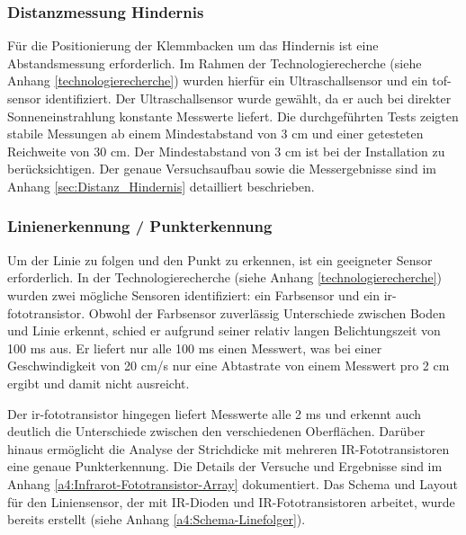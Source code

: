 \documentclass[../main.tex]{subfiles}
\begin{document}
\subsubsection{Distanzmessung Hindernis}
Für die Positionierung der Klemmbacken um das Hindernis ist eine Abstandsmessung erforderlich. Im Rahmen der Technologierecherche (siehe Anhang \ref{technologierecherche}) wurden hierfür ein Ultraschallsensor und ein \acrshort{tof-sensor} identifiziert. Der Ultraschallsensor wurde gewählt, da er auch bei direkter Sonneneinstrahlung konstante Messwerte liefert. Die durchgeführten Tests zeigten stabile Messungen ab einem Mindestabstand von 3 cm und einer getesteten Reichweite von 30 cm. Der Mindestabstand von 3 cm ist bei der Installation zu berücksichtigen. Der genaue Versuchsaufbau sowie die Messergebnisse sind im Anhang \ref{sec:Distanz_Hindernis} detailliert beschrieben.

\newpage

\subsubsection{Linienerkennung / Punkterkennung}
Um der Linie zu folgen und den Punkt zu erkennen, ist ein geeigneter Sensor erforderlich. In der Technologierecherche (siehe Anhang \ref{technologierecherche}) wurden zwei mögliche Sensoren identifiziert: ein Farbsensor und ein \gls{ir-fototransistor}. Obwohl der Farbsensor zuverlässig Unterschiede zwischen Boden und Linie erkennt, schied er aufgrund seiner relativ langen Belichtungszeit von 100 ms aus. Er liefert nur alle 100 ms einen Messwert, was bei einer Geschwindigkeit von 20 cm/s nur eine Abtastrate von einem Messwert pro 2 cm ergibt und damit nicht ausreicht.

Der \gls{ir-fototransistor} hingegen liefert Messwerte alle 2 ms und erkennt auch deutlich die Unterschiede zwischen den verschiedenen Oberflächen. Darüber hinaus ermöglicht die Analyse der Strichdicke mit mehreren IR-Fototransistoren eine genaue Punkterkennung. Die Details der Versuche und Ergebnisse sind im Anhang \ref{a4:Infrarot-Fototransistor-Array} dokumentiert.
Das Schema und Layout für den Liniensensor, der mit IR-Dioden und IR-Fototransistoren arbeitet, wurde bereits erstellt (siehe Anhang \ref{a4:Schema-Linefolger}).
\end{document}
